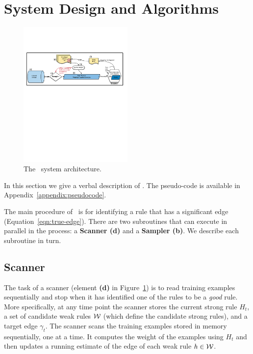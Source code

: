 \section{System Design and Algorithms} \label{sec:Algorithms}

\begin{figure}
\centering
    \includegraphics[width=0.5\textwidth]{figs/SingleMachine.pdf}
    \caption{The \Sparrow\ system architecture.}\label{fig:architecture}
    \vspace{0pt}
\end{figure}

In this section we give a verbal description of \Sparrow. The
pseudo-code is available in Appendix~\ref{appendix:pseudocode}.

The main procedure of \Sparrow\ is for identifying a rule that has a significant
edge (Equation~\ref{eqn:true-edge}). There are two
subroutines that can execute in parallel in the process: a {\bf Scanner (d)} and a
{\bf Sampler (b)}. We describe each subroutine in turn.


\subsection*{Scanner}

The task of a scanner (element {\bf (d)} in Figure~\ref{fig:architecture})
is to read training examples sequentially and stop
when it has identified one of the rules to be a {\em good} rule. More
specifically, at any time point the scanner stores the current strong
rule $H_t$, a set of candidate weak rules ${\cal W}$ (which
define the candidate strong rules), and a target
edge $\gamma_t$. The scanner scans the training examples stored in
memory sequentially, one at a time. It computes the weight of the
examples using $H_t$ and then updates a running estimate of the edge
of each weak rule $h \in {\cal W}$.

